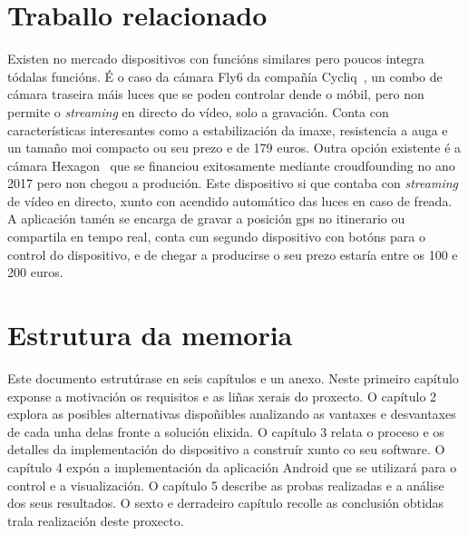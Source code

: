 \section{Traballo relacionado}
Existen no mercado dispositivos con funcións similares pero poucos integra tódalas funcións. É o caso da cámara Fly6 da compañía Cycliq~\cite{Fly6CERear}, un combo de cámara traseira máis luces que se poden controlar dende o móbil, pero non permite o \emph{streaming} en directo do vídeo, solo a gravación. Conta con características interesantes como a estabilización da imaxe, resistencia a auga e un tamaño moi compacto ou seu prezo e de 179 euros. Outra opción existente é a cámara Hexagon~\cite{HEXAGONCameraSignals} que se financiou exitosamente mediante croudfounding no ano 2017 pero non chegou a produción. Este dispositivo si que contaba con \emph{streaming} de vídeo en directo, xunto con acendido automático das luces en caso de freada. A aplicación tamén se encarga de gravar a posición gps no itinerario ou compartila en tempo real, conta cun segundo dispositivo con botóns para o control do dispositivo, e de chegar a producirse o seu prezo estaría entre os 100 e 200 euros.


\section{Estrutura da memoria}
Este documento estrutúrase en seis capítulos e un anexo. Neste primeiro capítulo exponse a motivación os requisitos e as liñas xerais do proxecto. O capítulo 2 explora as posibles alternativas dispoñibles analizando as vantaxes e desvantaxes de cada unha delas fronte a solución elixida. O capítulo 3 relata o proceso e os detalles da implementación do dispositivo a construír xunto co seu software. O capítulo 4 expón a implementación da aplicación Android que se utilizará para o control e a visualización. O capítulo 5 describe as probas realizadas e a análise dos seus resultados. O sexto e derradeiro capítulo recolle as conclusión obtidas trala realización deste proxecto.
